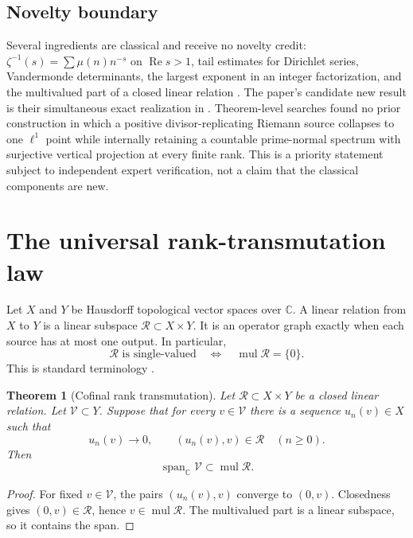 \documentclass[11pt]{article}
\newtheorem{theorem}{Theorem}[section]
\theoremstyle{definition}
\theoremstyle{remark}
\newcommand{\C}{\mathbb C}
\newcommand{\cR}{\mathcal R}
\newcommand{\Rea}{\operatorname{Re}}
\newcommand{\mul}{\operatorname{mul}}
\newcommand{\Span}{\operatorname{span}}
\begin{document}
\subsection*{Novelty boundary}

Several ingredients are classical and receive no novelty credit:
\(\zeta^{-1}(s)=\sum\mu(n)n^{-s}\) on \(\Rea s>1\), tail estimates for
Dirichlet series, Vandermonde determinants, the largest exponent in an
integer factorization, and the multivalued part of a closed linear relation
\cite{Titchmarsh1986,Niven1969,Arens1961}.  The paper's candidate new result
is their simultaneous exact realization in .  Theorem-level
searches found no prior construction in which a positive divisor-replicating
Riemann source collapses to one \(\ell^1\) point while internally retaining a
countable prime-normal spectrum with surjective vertical projection at every
finite rank.  This is a priority statement subject to independent expert
verification, not a claim that the classical components are new.

\section{The universal rank-transmutation law}

Let \(X\) and \(Y\) be Hausdorff topological vector spaces over \(\C\).
A linear relation from \(X\) to \(Y\) is a linear subspace
\(\cR\subset X\times Y\).  It is an operator graph exactly when each source
has at most one output.  In particular,
\[
               \cR\text{ is single-valued}
               \quad\Longleftrightarrow\quad
               \mul\cR=\{0\}.
\tag{2.1}\label{eq:single-valued}
\]
This is standard terminology \cite{Arens1961,HassiDeSnooSzafraniec2009}.

\begin{theorem}[Cofinal rank transmutation]\label{thm:abstract}
Let \(\cR\subset X\times Y\) be a closed linear relation.  Let
\(\mathcal V\subset Y\).  Suppose that for every \(v\in\mathcal V\) there is
a sequence \(u_n(v)\in X\) such that
\[
             u_n(v)\longrightarrow0,
             \qquad (u_n(v),v)\in\cR\quad(n\geq0).
\tag{2.2}\label{eq:collapse-hyp}
\]
Then
\[
                         \Span_\C\mathcal V\subset\mul\cR.
\tag{2.3}\label{eq:span-mul}
\]
\end{theorem}

\begin{proof}
For fixed \(v\in\mathcal V\), the pairs
\((u_n(v),v)\) converge to \((0,v)\).  Closedness gives
\((0,v)\in\cR\), hence \(v\in\mul\cR\).  The multivalued part is a linear
subspace, so it contains the span.
\end{proof}
\end{document}
